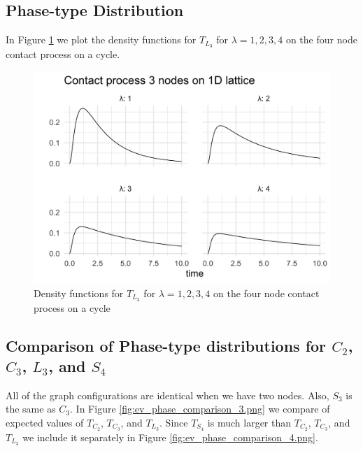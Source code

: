 \documentclass{article}
\theoremstyle{plain}
\theoremstyle{definition}
\theoremstyle{remark}
\numberwithin{equation}{section}
\begin{document}
\subsection{Phase-type Distribution}

In Figure \ref{fig:lattice_3_contact_phase_densities} we plot the density functions for $T_{L_3}$ for $\lambda = 1, 2, 3, 4$ on the four node contact process on a cycle.

\begin{figure}[h]
  \centering
    \includegraphics[width=.80\textwidth]{figures/lattice_3_contact_phase_densities.png}
   \caption{Density functions for $T_{L_3}$ for $\lambda = 1, 2, 3, 4$ on the four node contact process on a cycle}
  \label{fig:lattice_3_contact_phase_densities}
\end{figure}

\subsection{Comparison of Phase-type distributions for \texorpdfstring{$C_2$}{C2}, \texorpdfstring{$C_3$}{C3}, \texorpdfstring{$L_3$}{L3}, and \texorpdfstring{$S_4$}{S4}}

All of the graph configurations are identical when we have two nodes.
Also, $S_3$ is the same as $C_3$.
In Figure \ref{fig:ev_phase_comparison_3.png} we compare of expected values of $T_{C_2}$, $T_{C_3}$, and $T_{L_3}$.
Since $T_{S_4}$ is much larger than $T_{C_2}$, $T_{C_3}$, and $T_{L_3}$ we include it separately in Figure \ref{fig:ev_phase_comparison_4.png}.
\end{document}
